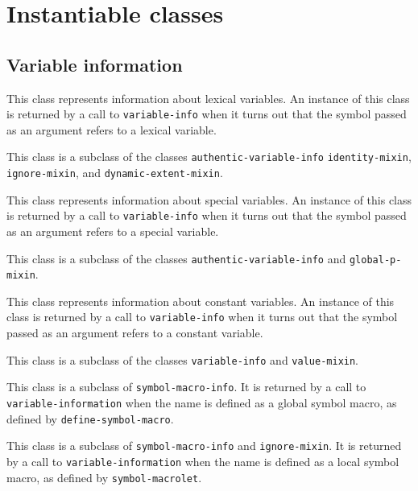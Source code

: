 \section{Instantiable classes}

\subsection{Variable information}


This class represents information about lexical variables.  An
instance of this class is returned by a call to \texttt{variable-info}
when it turns out that the symbol passed as an argument refers to a
lexical variable.

This class is a subclass of the classes
\texttt{authentic-variable-info} \texttt{identity-mixin},
\texttt{ignore-mixin}, and \texttt{dynamic-extent-mixin}.


This class represents information about special variables.   An
instance of this class is returned by a call to \texttt{variable-info}
when it turns out that the symbol passed as an argument refers to a
special variable.

This class is a subclass of the classes
\texttt{authentic-variable-info} and \texttt{global-p-mixin}.


This class represents information about constant variables.   An
instance of this class is returned by a call to \texttt{variable-info}
when it turns out that the symbol passed as an argument refers to a
constant variable.

This class is a subclass of the classes \texttt{variable-info} and
\texttt{value-mixin}.


This class is a subclass of \texttt{symbol-macro-info}.  It is
returned by a call to \texttt{variable-information} when the name is
defined as a global symbol macro, as defined by
\texttt{define-symbol-macro}.


This class is a subclass of \texttt{symbol-macro-info} and
\texttt{ignore-mixin}.  It is returned by a call to
\texttt{variable-information} when the name is defined as a local
symbol macro, as defined by \texttt{symbol-macrolet}.

